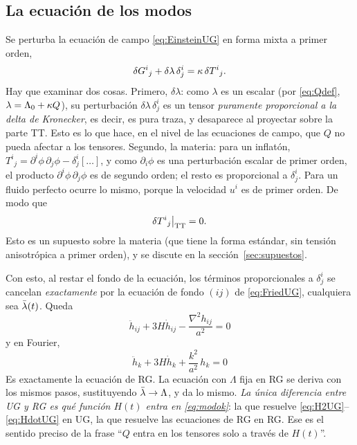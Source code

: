 \subsection{La ecuación de los modos}
\label{sec:tt-ecuacion}

Se perturba la ecuación de campo \eqref{eq:EinsteinUG} en forma mixta a primer orden,
\begin{equation}
\delta G^i{}_j+\delta\lambda\,\delta^i_j=\kappa\,\delta T^i{}_j.
\label{eq:pert}
\end{equation}
Hay que examinar dos cosas. Primero, $\delta\lambda$: como $\lambda$ es un escalar (por \eqref{eq:Qdef}, $\lambda=\Lambda_0+\kappa Q$), su perturbación $\delta\lambda\,\delta^i_j$ es un tensor \emph{puramente proporcional a la delta de Kronecker}, es decir, es pura traza, y desaparece al proyectar sobre la parte TT. Esto es lo que hace, en el nivel de las ecuaciones de campo, que $Q$ no pueda afectar a los tensores. Segundo, la materia: para un inflatón, $T^i{}_j=\partial^i\phi\,\partial_j\phi-\delta^i_j[\ldots]$, y como $\partial_i\phi$ es una perturbación escalar de primer orden, el producto $\partial^i\phi\,\partial_j\phi$ es de segundo orden; el resto es proporcional a $\delta^i_j$. Para un fluido perfecto ocurre lo mismo, porque la velocidad $u^i$ es de primer orden. De modo que 
\begin{equation}
\delta T^i{}_j\big|_{\rm TT}=0.
\label{eq:TTmateria}
\end{equation}
Esto es un supuesto sobre la materia (que tiene la forma estándar, sin tensión anisotrópica a primer orden), y se discute en la sección~\ref{sec:supuestos}.

Con esto, al restar el fondo de la ecuación, los términos proporcionales a $\delta^i_j$ se cancelan \emph{exactamente} por la ecuación de fondo $(ij)$ de \eqref{eq:FriedUG}, cualquiera sea $\bar\lambda(t)$. Queda
\begin{equation}
\boxed{\;\ddot h_{ij}+3H\dot h_{ij}-\frac{\nabla^2h_{ij}}{a^2}=0\;}
\label{eq:modo}
\end{equation}
y en Fourier,
\begin{equation}
\boxed{\;\ddot h_k+3H\dot h_k+\frac{k^2}{a^2}\,h_k=0\;}
\label{eq:modok}
\end{equation}
Es exactamente la ecuación de RG. La ecuación con $\Lambda$ fija en RG se deriva con los mismos pasos, sustituyendo $\bar\lambda\to\Lambda$, y da lo mismo. \emph{La única diferencia entre UG y RG es qué función $H(t)$ entra en \eqref{eq:modok}}: la que resuelve \eqref{eq:H2UG}--\eqref{eq:HdotUG} en UG, la que resuelve las ecuaciones de RG en RG. Ese es el sentido preciso de la frase ``$Q$ entra en los tensores solo a través de $H(t)$''.

